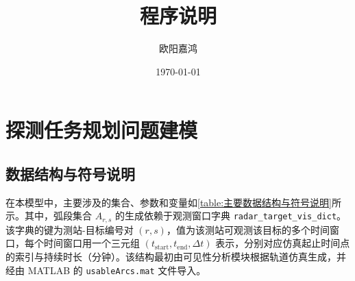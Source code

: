 \documentclass[openany,12pt,UTF8]{ctexart}
\title{程序说明}
\author{欧阳嘉鸿}
\date{\today}
\begin{document}
\maketitle
\newpage
\tableofcontents
\newpage
\section{探测任务规划问题建模}

\subsection{数据结构与符号说明}
在本模型中，主要涉及的集合、参数和变量如\autoref{table:主要数据结构与符号说明}所示。其中，弧段集合 $A_{r,s}$ 的生成依赖于观测窗口字典 \texttt{radar\_target\_vis\_dict}。该字典的键为测站-目标编号对 $(r,s)$，值为该测站可观测该目标的多个时间窗口，每个时间窗口用一个三元组 $(t_{\text{start}}, t_{\text{end}}, \Delta t)$ 表示，分别对应仿真起止时间点的索引与持续时长（分钟）。该结构最初由可见性分析模块根据轨道仿真生成，并经由 MATLAB 的 \texttt{usableArcs.mat} 文件导入。
\end{document}
